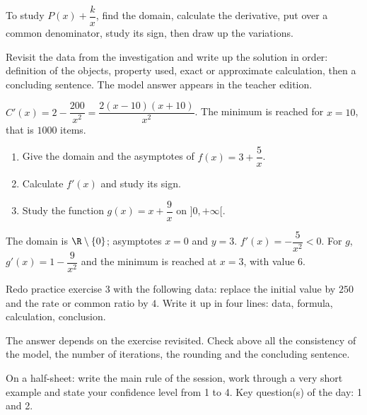 \begin{summary}To study $P(x)+\dfrac{k}{x}$, find the domain, calculate the derivative, put over a common denominator, study its sign, then draw up the variations.\end{summary}

\begin{example}
Revisit the data from the investigation and write up the solution in order: definition of the objects, property used, exact or approximate calculation, then a concluding sentence. The model answer appears in the teacher edition.
\end{example}
\begin{solution}$C'(x)=2-\dfrac{200}{x^2}=\dfrac{2(x-10)(x+10)}{x^2}$. The minimum is reached for $x=10$, that is $\num{1000}$ items.\end{solution}

\begin{exercise}[essential]
\begin{enumerate}\item Give the domain and the asymptotes of $f(x)=3+\dfrac{5}x$.\item Calculate $f'(x)$ and study its sign.\item Study the function $g(x)=x+\dfrac{9}x$ on $]0,+\infty[$.\end{enumerate}
\end{exercise}
\begin{solution}The domain is $\R\setminus\{0\}$; asymptotes $x=0$ and $y=3$. $f'(x)=-\dfrac{5}{x^2}<0$. For $g$, $g'(x)=1-\dfrac{9}{x^2}$ and the minimum is reached at $x=3$, with value $6$.\end{solution}


\begin{homework}Redo practice exercise 3 with the following data: replace the initial value by $250$ and the rate or common ratio by $4$. Write it up in four lines: data, formula, calculation, conclusion.\end{homework}
\begin{solution}The answer depends on the exercise revisited. Check above all the consistency of the model, the number of iterations, the rounding and the concluding sentence.\end{solution}

\begin{exitticket}[3 minutes]On a half-sheet: write the main rule of the session, work through a very short example and state your confidence level from 1 to 4. Key question(s) of the day: 1 and 2.\end{exitticket}

